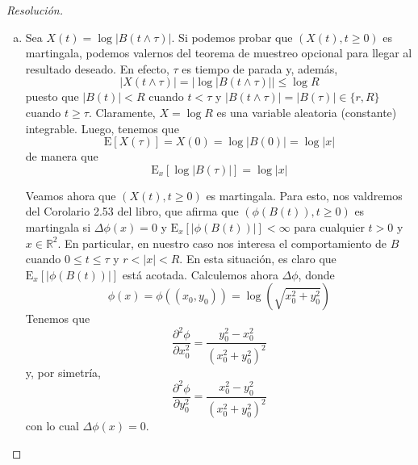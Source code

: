 \documentclass[a4paper,11pt]{article}
\newcommand{\abs}[1]{\ensuremath{\left\lvert #1 \right\rvert}}
\newcommand{\Exp}[1]{\ensuremath{\textrm{E}\left[#1\right]}}
\newcommand{\Expx}[2]{\ensuremath{\textrm{E}_{#1}\left[#2\right]}}
\begin{document}
\begin{proof}[Resoluci\'on]
$ $ 
\begin{enumerate}[a.]
    \item Sea $X(t) = \log \abs{B(t \wedge \tau)}$. Si podemos probar que
    $(X(t), t \geq 0)$ es
    martingala, podemos valernos del teorema de muestreo opcional para llegar al
    resultado deseado. En efecto, $\tau$ es tiempo de parada y, además,
       $$\abs{X(t \wedge \tau)} = \abs{\log \abs{B(t \wedge \tau)}} \leq \log R$$
    puesto que $\abs{B(t)} < R$  cuando $t < \tau$ y
    $\abs{B(t \wedge \tau)} = \abs{B(\tau)} \in \{r, R\}$ cuando
    $t \geq \tau$. Claramente, $X = \log R$ es una variable aleatoria (constante)
    integrable. Luego, tenemos que
    $$\Exp{X(\tau)} = X(0) = \log \abs{B(0)} = \log \abs{x}$$
    de manera que 
    $$\Expx{x}{\log \abs{B(\tau)}} = \log \abs{x}$$

    Veamos ahora que $(X(t), t \geq 0)$ es martingala. Para esto, nos valdremos del
    Corolario 2.53 del libro, que afirma que $(\phi(B(t)), t \geq 0)$ es martingala
    si $\Delta \phi(x) = 0$ y $\Expx{x}{\abs{\phi(B(t))}} < \infty$
    para cualquier $t > 0$ y $x \in \mathbb{R}^2$. En particular, en nuestro caso
    nos interesa el comportamiento de $B$ cuando $0 \leq t \leq \tau$ y 
    $r < \abs{x} < R$. En esta situación, es claro que $\Expx{x}{\abs{\phi(B(t))}}$
    está acotada. Calculemos ahora
    $\Delta \phi$, donde
    $$\phi(x) = \phi((x_0,y_0)) = \log\left(\sqrt{x_0^2 + y_0^2}\right)$$
    Tenemos que 
    $$\frac{\partial^2 \phi}{\partial x_0^2} = \frac{y_0^2 - x_0^2}{(x_0^2 + y_0^2)^2}$$
    y, por simetría,
    $$\frac{\partial^2 \phi}{\partial y_0^2} = \frac{x_0^2 - y_0^2}{(x_0^2 + y_0^2)^2}$$
    con lo cual $\Delta \phi(x) = 0$.
    

\end{enumerate}
\end{proof}
\end{document}
